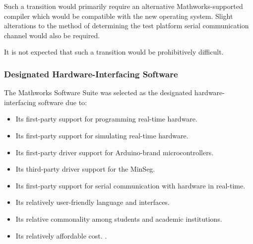 \documentclass[crop=false,float=true,class=scrreprt]{standalone}
\begin{document}
Such a transition would primarily require an alternative Mathworks-supported compiler 
 \cite{REF:online:mathworks:supportedCompilers}
which would be compatible with the new operating system.
Slight alterations to the method of determining the test platform serial communication channel\iffalse, 
as described in Section~%
\ref{SEC:testPlatform:determiningSerialCommunicationChannel?}\fi
would also be required.

It is not expected that such a transition would be prohibitively difficult.




\clearpage




\subsubsection{Designated Hardware-Interfacing Software}
\label{SEC:preliminaryDecisions:selectionHardware:developmentPC:mathworks}

The Mathworks Software Suite was selected as the designated hardware-interfacing software due to:

\vspace{-0em}
\begin{itemize}[leftmargin=*]

\item Its first-party support for programming real-time hardware.

\item Its first-party support for simulating real-time hardware.

\item Its first-party driver support for Arduino-brand microcontrollers.

\item Its third-party driver support for the MinSeg.

\item Its first-party support for serial communication with hardware in real-time.

\item Its relatively user-friendly language and interfaces.

\item Its relative commonality among students and academic institutions.\\[+0.25em]

\item Its relatively affordable cost. 
      .

\end{itemize}
\vspace{-1em}
\end{document}
